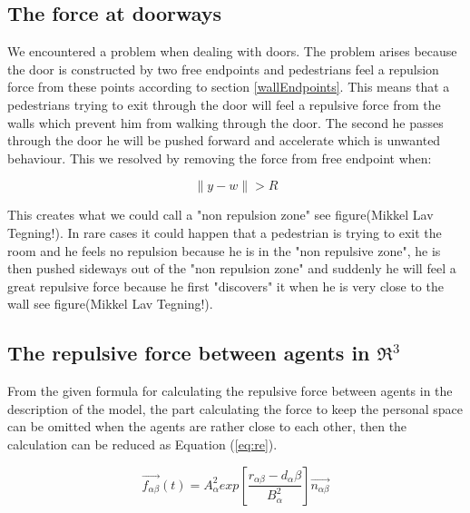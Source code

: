\subsection{The force at doorways}
We encountered a problem when dealing with doors. The problem arises because 
the door is constructed by two free endpoints and pedestrians feel a repulsion 
force from these points according to section \ref{wallEndpoints}. This means 
that a pedestrians trying to exit through the door will feel a repulsive force 
from the walls which prevent him from walking through the door. The second he 
passes through the door he will be pushed forward and accelerate which is unwanted 
behaviour. This we resolved by removing the force from free endpoint when:

\begin{equation}
\| y - w \| > R
\end{equation}

This creates what we could call a "non repulsion zone" see figure(Mikkel Lav Tegning!).
In rare cases it could happen that a pedestrian is trying to exit the room and he feels 
no repulsion because he is in the "non repulsive zone", he is then pushed sideways out 
of the "non repulsion zone" and suddenly he will feel a great repulsive force because 
he first "discovers" it when he is very close to the wall see figure(Mikkel Lav Tegning!).

\subsection{The repulsive force between agents in $ \Re ^{3}$}
From the given formula for calculating the repulsive force between agents in the 
description of the model, the part calculating the force to keep the personal space 
can be omitted when the agents are rather close to each other, then the calculation 
can be reduced as Equation (\ref{eq:re}).

\begin{equation}\label{eq:re}
\overrightarrow{f_{\alpha\beta}}(t) = A_{\alpha}^{2} exp\left[ \frac{r_{\alpha\beta} - d_{\alpha}\beta}{B_{\alpha}^{2}}\right]  \overrightarrow{n_{\alpha\beta}}
\end{equation}

